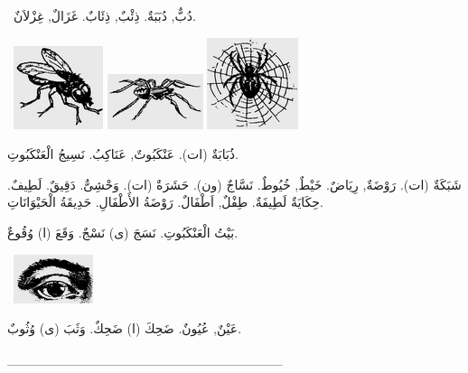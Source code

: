 \documentclass[a5paper]{article}
\begin{document}
\ دُبٌّ, دُبَبَةٌ. ذِئْبٌ, ذِئَابٌ. غَزَالٌ, غِزْلاَنٌ. 

\  \includegraphics[width=1.0311in,height=0.9583in]{images/MuhammadBagauddinprettified-img118.png}   \includegraphics[width=1.1043in,height=0.6354in]{images/MuhammadBagauddinprettified-img119.png}   \includegraphics[width=1.052in,height=1.052in]{images/MuhammadBagauddinprettified-img120.png}  

ذُبَابَةٌ (ات). عَنْكَبُوتٌ, عَنَاكِبُ. نَسِيجُ الْعَنْكَبُوتِ. 

شَبَكَةٌ (ات). رَوْضَةٌ, رِيَاضٌ. خَيْطٌ, خُيُوطٌ. نَسَّاجٌ (ون). حَشَرَةٌ (ات). وَحْشِىٌّ. دَقِيقٌ. لَطِيفٌ. حِكَايَةٌ لَطِيفَةٌ. طِفْلٌ, اَطْفَالٌ. رَوْضَةُ الأَطْفَالِ. حَدِيقَةُ الْحَيْوَانَاتِ. 

بَيْتُ الْعَنْكَبُوتِ. نَسَجَ (ى) نَسْجٌ. وَقَعَ (ا) وُقُوعٌ. 

\  \includegraphics[width=0.9165in,height=0.5626in]{images/MuhammadBagauddinprettified-img121.png} 

عَيْنٌ, عُيُونٌ. ضَحِكَ (ا) ضَحِكٌ. وَثَبَ (ى) وُثُوبٌ.

\_\_\_\_\_\_\_\_\_\_\_\_\_\_\_\_\_\_\_\_\_\_\_\_\_\_\_\_\_
\end{document}
